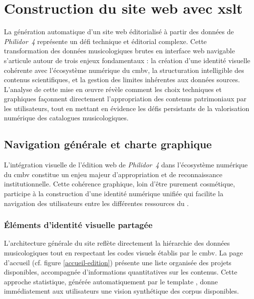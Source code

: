 \section{Construction du site web avec \gls{xslt}}

La génération automatique d'un site web éditorialisé à partir des données de \textit{Philidor~4} représente un défi technique et éditorial complexe. Cette transformation des données musicologiques brutes en interface web navigable s'articule autour de trois enjeux fondamentaux : la création d'une identité visuelle cohérente avec l'écosystème numérique du \gls{cmbv}, la structuration intelligible des contenus scientifiques, et la gestion des limites inhérentes aux données sources. L'analyse de cette mise en œuvre révèle comment les choix techniques et graphiques façonnent directement l'appropriation des contenus patrimoniaux par les utilisateurs, tout en mettant en évidence les défis persistants de la valorisation numérique des catalogues musicologiques.

\subsection{Navigation générale et charte graphique}

L'intégration visuelle de l'édition web de \textit{Philidor~4} dans l'écosystème numérique du \gls{cmbv} constitue un enjeu majeur d'appropriation et de reconnaissance institutionnelle. Cette cohérence graphique, loin d'être purement cosmétique, participe à la construction d'une identité numérique unifiée qui facilite la navigation des utilisateurs entre les différentes ressources du .

\subsubsection{Éléments d'identité visuelle partagée}

L'architecture générale du site reflète directement la hiérarchie des données musicologiques tout en respectant les codes visuels établis par le \gls{cmbv}. La page d'accueil (cf. figure \ref{accueil-edition}) présente une liste organisée des projets disponibles, accompagnée d'informations quantitatives sur les contenus. Cette approche statistique, générée automatiquement par le template , donne immédiatement aux utilisateurs une vision synthétique des corpus disponibles.

